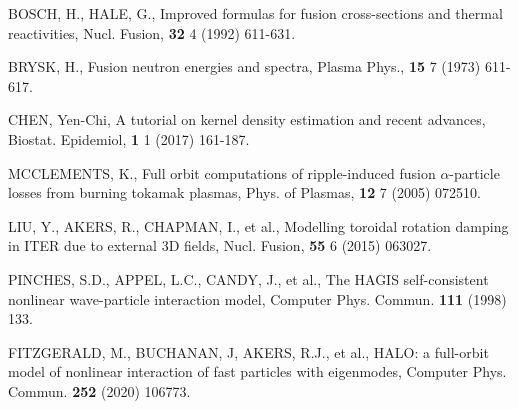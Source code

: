 \documentclass[10pt, a4paper, twoside]{article}
\begin{document}
\begin{thebibliography}{9}
    BOSCH, H., HALE, G.,
    Improved formulas for fusion cross-sections and thermal reactivities,
    Nucl. Fusion,
    \textbf{32} 4
    (1992)
    611-631.

    BRYSK, H.,
    Fusion neutron energies and spectra,
    Plasma Phys.,
    \textbf{15} 7
    (1973)
    611-617.

    CHEN, Yen-Chi,
    A tutorial on kernel density estimation and recent advances,
    Biostat. Epidemiol,
    \textbf{1} 1
    (2017)
    161-187.

    MCCLEMENTS, K.,
    Full orbit computations of ripple-induced fusion $\alpha$-particle losses from burning tokamak plasmas,
    Phys. of Plasmas,
    \textbf{12} 7
    (2005)
    072510.

    LIU, Y., AKERS, R., CHAPMAN, I., et al.,
    Modelling toroidal rotation damping in ITER due to external 3D fields,
    Nucl. Fusion,
    \textbf{55} 6
    (2015)
    063027.

    PINCHES, S.D., APPEL, L.C., CANDY, J., et al.,
    The HAGIS self-consistent nonlinear wave-particle interaction model,
    Computer Phys. Commun.
    \textbf{111}
    (1998)
    133.

    FITZGERALD, M., BUCHANAN, J, AKERS, R.J., et al.,
    HALO: a full-orbit model of nonlinear interaction of fast particles with eigenmodes,
    Computer Phys. Commun.
    \textbf{252}
    (2020)
    106773.


\end{thebibliography}
\end{document}
